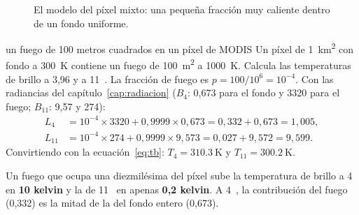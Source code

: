 \begin{figure}[ht]
\centering
{}
\caption{El modelo del píxel mixto: una pequeña fracción muy caliente dentro de un fondo
uniforme.}
\label{fig:mixto}
\end{figure}

\begin{ejemplo}{un fuego de 100 metros cuadrados en un píxel de MODIS}
Un píxel de \SI{1}{\kilo\metre\squared} con fondo a 300~K contiene un fuego de
\SI{100}{\metre\squared} a 1000~K. Calcula las temperaturas de brillo a 3,96 y a 11~\um.
\solucion La fracción de fuego es $p = 100/10^6 = 10^{-4}$. Con las radiancias del
capítulo~\ref{cap:radiacion} ($B_4$: 0,673 para el fondo y 3320 para el fuego; $B_{11}$: 9,57 y
274):
\begin{align*}
  L_4 &= 10^{-4}\times 3320 + 0{,}9999\times 0{,}673 = 0{,}332 + 0{,}673 = 1{,}005,\\
  L_{11} &= 10^{-4}\times 274 + 0{,}9999\times 9{,}573 = 0{,}027 + 9{,}572 = 9{,}599.
\end{align*}
Convirtiendo con la ecuación~\eqref{eq:tb}: $T_4 = \SI{310.3}{\kelvin}$ y $T_{11} = \SI{300.2}{\kelvin}$.

Un fuego que ocupa una diezmilésima del píxel sube la temperatura de brillo a 4~\um{} en
\textbf{10 kelvin} y la de 11~\um{} en apenas \textbf{0,2 kelvin}. A 4~\um, la contribución del
fuego (0,332) es la mitad de la del fondo entero (0,673).
\end{ejemplo}

